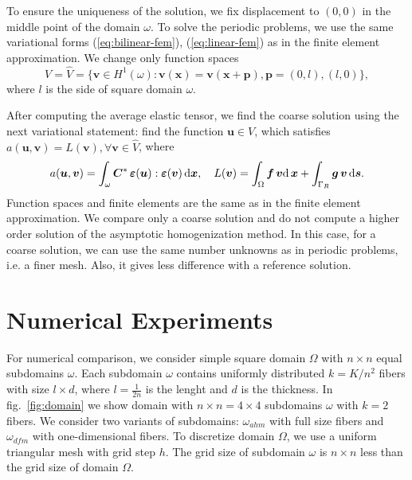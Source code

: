 \documentclass[a4paper]{jpconf}
\begin{document}
To ensure the uniqueness of the solution, we fix displacement  to $(0, 0)$ in the middle point of the domain $\omega$. To solve the periodic problems, we use the same variational forms (\ref{eq:bilinear-fem}), (\ref{eq:linear-fem}) as in the finite element approximation. We change only function spaces
\[
V = \widehat{V} = \{\bm{v} \in H^1(\omega): \bm{v}(\bm{x}) = \bm{v}(\bm{x} + \bm{p}), \bm{p} = (0, l), (l, 0) \},
\]
where $l$ is the side of square domain $\omega$.

After computing the average elastic tensor, we find the coarse solution using the next variational statement: find the function $\bm{u} \in V$, which satisfies $a(\bm{u}, \bm{v}) = L(\bm{v}), \forall \bm{v} \in \widehat{V}$, where
\[
a(\bm{u}, \bm{v}) = \int_\omega \bm{C}^* \, \bm{\varepsilon}(\bm{u}) : \bm{\varepsilon}(\bm{v})\, {\rm d}\bm{x}, \quad
L(\bm{v}) = \int_\Omega \bm{f}\, \bm{v} {\rm d}\, \bm{x} + \int_{\Gamma_R} \bm{g}\, \bm{v}\, {\rm d}\bm{s}.
\]
Function spaces and finite elements are the same as in the finite element approximation. We compare only a coarse solution and do not compute a higher order solution of the asymptotic homogenization method. In this case, for a coarse solution, we can use the same number unknowns as in periodic problems, i.e. a finer mesh. Also, it gives less difference with a reference solution.

\section{Numerical Experiments}

For numerical comparison, we consider simple square domain $\Omega$ with $n \times n$ equal subdomains $\omega$. Each subdomain $\omega$ contains uniformly distributed $k=K/n^2$ fibers with size $l \times d$, where $l=\frac{1}{2n}$ is the lenght and $d$ is the thickness. In fig.~\ref{fig:domain} we show domain with $n \times n = 4 \times 4$ subdomains $\omega$ with $k=2$ fibers. We consider two variants of subdomains: $\omega_{ahm}$ with full size fibers and $\omega_{dfm}$ with one-dimensional fibers. To discretize domain $\Omega$, we use a uniform triangular mesh with grid step $h$. The grid size of subdomain $\omega$ is $n \times n$ less than the grid size of domain $\Omega$.
\end{document}
